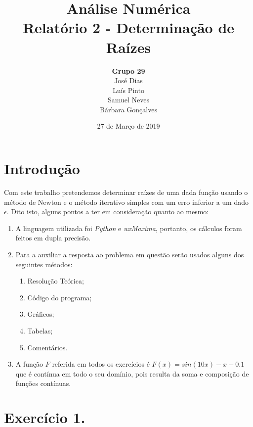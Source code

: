 \documentclass{article}
\title{\textbf{Análise Numérica\\Relatório 2 - Determinação de Raízes}}
\author{\textbf{Grupo 29}\\[4mm]José Dias\\Luís Pinto\\Samuel Neves\\Bárbara Gonçalves\\}
\date{27 de Março de 2019}
\begin{document}
\maketitle
\clearpage
\pagestyle{fancy}
\fancyhf{}
\setlength{\headheight}{30pt}
\setlength{\footskip}{15pt}
\rfoot{\thepage}
\section{Introdução}
\hspace{6mm}Com este trabalho pretendemos determinar raízes de uma dada função usando o método de Newton e o método iterativo simples com um erro inferior a um dado $\epsilon$. Dito isto, alguns pontos a ter em consideração quanto ao mesmo:
\begin{enumerate}
  \item{A linguagem utilizada foi \textit{Python} e \textit{wxMaxima}, portanto, os cálculos foram feitos em dupla precisão.}
  \item{Para a auxiliar a resposta ao problema em questão serão usados alguns dos seguintes métodos:}
  \begin{enumerate}
    \item[\textbullet]{Resolução Teórica;}
    \item[\textbullet]{Código do programa;}
    \item[\textbullet]{Gráficos;}
    \item[\textbullet]{Tabelas;}
    \item[\textbullet]{Comentários.}
  \end{enumerate}
  \item{A função $F$ referida em todos os exercícios é $F(x)=sin(10x)-x-0.1$ que é contínua em todo o seu domínio, pois resulta da soma e composição de funções contínuas.}
\end{enumerate}
\section*{Exercício 1.}
\end{document}
